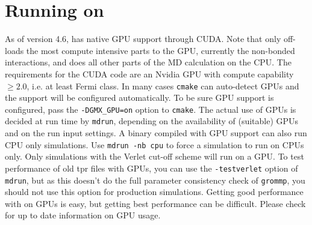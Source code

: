 \section{Running {\gromacs} on }
As of version 4.6, {\gromacs} has native GPU support through CUDA.
Note that {\gromacs} only off-loads the most compute intensive parts
to the GPU, currently the non-bonded interactions, and does all other
parts of the MD calculation on the CPU. The requirements for the CUDA code
are an Nvidia GPU with compute capability $\geq 2.0$, i.e. at
least Fermi class.
In many cases {\tt cmake} can auto-detect GPUs and the support will be
configured automatically. To be sure GPU support is configured, pass
the {\tt -DGMX_GPU=on} option to {\tt cmake}. The actual use of GPUs
is decided at run time by {\tt mdrun}, depending on the availability
of (suitable) GPUs and on the run input settings. A binary compiled
with GPU support can also run CPU only simulations. Use {\tt mdrun -nb cpu}
to force a simulation to run on CPUs only. Only simulations with the Verlet
cut-off scheme will run on a GPU. To test performance of old tpr files
with GPUs, you can use the {\tt -testverlet} option of {\tt mdrun},
but as this doesn't do the full parameter consistency check of {\tt grommp},
you should not use this option for production simulations.
Getting good performance with {\gromacs} on GPUs is easy,
but getting best performance can be difficult.
Please check {\wwwpage} for up to date information on GPU usage.

